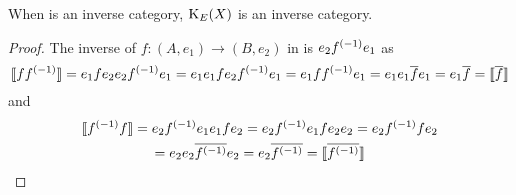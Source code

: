 \begin{lemma}\label{lem:the_idempotent_splitting_of_an_inverse_category_is_an_inverse_category}
When \X is an inverse category, $\text{K}_{E}(X)$ is an inverse category.
\end{lemma}
\begin{proof}
The inverse
of $f:(A,e_1)\to(B,e_2)$
in  is $e_2{f}^{(-1)}e_1$ as
\[\llbracket f {f}^{(-1)} \rrbracket = e_1 f e_2 e_2 {f}^{(-1)} e_1
= e_1 e_1 f e_2 {f}^{(-1)} e_1
= e_1 f  {f}^{(-1)} e_1
= e_1 e_1 \overline{f} e_1
= e_1 \overline{f}
= \llbracket\overline{f}\rrbracket\]
and
\begin{multline*}
  \llbracket {f}^{(-1)} f\rrbracket=
e_2 {f}^{(-1)} e_1 e_1 f e_2
= e_2 {f}^{(-1)} e_1 f e_2 e_2
= e_2 {f}^{(-1)} f  e_2\\
= e_2 e_2 \overline{{f}^{(-1)}}  e_2
= e_2 \overline{{f}^{(-1)}}
= \llbracket\overline{{f}^{(-1)}}\rrbracket
\end{multline*}

\end{proof}

